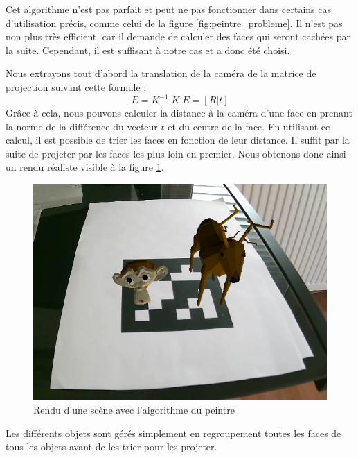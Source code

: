                 Cet algorithme n'est pas parfait et peut ne pas fonctionner dans certains cas d'utilisation précis, comme celui de la figure \ref{fig:peintre_probleme}. Il n'est pas non plus très efficient, car il demande de calculer des faces qui seront cachées par la suite. Cependant, il est suffisant à notre cas et a donc été choisi. 

                Nous extrayons tout d'abord la translation de la caméra de la matrice de projection suivant cette formule : 
                \begin{equation*}
                    E = K^{-1}.K.E = [R|t]
                \end{equation*}
                Grâce à cela, nous pouvons calculer la distance à la caméra d'une face en prenant la norme de la différence du vecteur $t$ et du centre de la face. En utilisant ce calcul, il est possible de trier les faces en fonction de leur distance. Il suffit par la suite de projeter par les faces les plus loin en premier. Nous obtenons donc ainsi un rendu réaliste visible à la figure \ref{fig:avec_peintre}.

                \begin{figure}[!h]
                    \centering
                    \includegraphics[scale=0.45]{img/rendu/avec_peintre.png}
                    \caption{Rendu d'une scène avec l'algorithme du peintre}
                    \label{fig:avec_peintre}
                \end{figure}

                Les différents objets sont gérés simplement en regroupement toutes les faces de tous les objets avant de les trier pour les projeter. 
